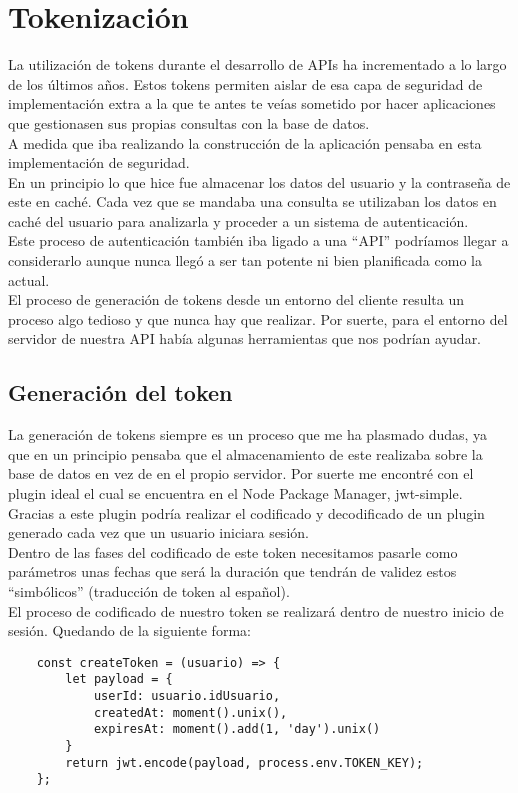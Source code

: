 \section{Tokenización}

La utilización de tokens durante el desarrollo de APIs ha incrementado a lo largo de los últimos años. Estos tokens permiten aislar de esa capa de seguridad de implementación extra a la que te antes te veías sometido por hacer aplicaciones que gestionasen sus propias consultas con la base de datos.
\\A medida que iba realizando la construcción de la aplicación pensaba en esta implementación de seguridad.
\\En un principio lo que hice fue almacenar los datos del usuario y la contraseña de este en caché. Cada vez que se mandaba una consulta se utilizaban los datos en caché del usuario para analizarla y proceder a un sistema de autenticación.
\\Este proceso de autenticación también iba ligado a una ``API'' podríamos llegar a considerarlo aunque nunca llegó a ser tan potente ni bien planificada como la actual.
\\El proceso de generación de tokens desde un entorno del cliente resulta un proceso algo tedioso y que nunca hay que realizar. Por suerte, para el entorno del servidor de nuestra API había algunas herramientas que nos podrían ayudar.

\subsection{Generación del token}
La generación de tokens siempre es un proceso que me ha plasmado dudas, ya que en un principio pensaba que el almacenamiento de este realizaba sobre la base de datos en vez de en el propio servidor. Por suerte me encontré con el plugin ideal el cual se encuentra en el Node Package Manager, jwt-simple.
\\Gracias a este plugin podría realizar el codificado y decodificado de un plugin generado cada vez que un usuario iniciara sesión.
\\Dentro de las fases del codificado de este token necesitamos pasarle como parámetros unas fechas que será la duración que tendrán de validez estos ``simbólicos'' (traducción de token al español).
\\El proceso de codificado de nuestro token se realizará dentro de nuestro inicio de sesión. Quedando de la siguiente forma:

\begin{verbatim}
    const createToken = (usuario) => {
        let payload = {
            userId: usuario.idUsuario,
            createdAt: moment().unix(),
            expiresAt: moment().add(1, 'day').unix()
        }
        return jwt.encode(payload, process.env.TOKEN_KEY);
    };
\end{verbatim}

